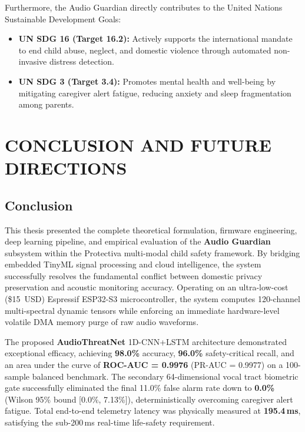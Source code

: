 \documentclass[12pt, a4paper]{report}
\begin{document}
Furthermore, the Audio Guardian directly contributes to the United Nations Sustainable Development Goals:
\begin{itemize}
    \item \textbf{UN SDG 16 (Target 16.2):} Actively supports the international mandate to end child abuse, neglect, and domestic violence through automated non-invasive distress detection.
    \item \textbf{UN SDG 3 (Target 3.4):} Promotes mental health and well-being by mitigating caregiver alert fatigue, reducing anxiety and sleep fragmentation among parents.
\end{itemize}

\chapter{CONCLUSION AND FUTURE DIRECTIONS}

\section{Conclusion}
This thesis presented the complete theoretical formulation, firmware engineering, deep learning pipeline, and empirical evaluation of the \textbf{Audio Guardian} subsystem within the Protectiva multi-modal child safety framework. By bridging embedded TinyML signal processing and cloud intelligence, the system successfully resolves the fundamental conflict between domestic privacy preservation and acoustic monitoring accuracy. Operating on an ultra-low-cost (\$15~USD) Espressif ESP32-S3 microcontroller, the system computes 120-channel multi-spectral dynamic tensors while enforcing an immediate hardware-level volatile DMA memory purge of raw audio waveforms.

The proposed \textbf{AudioThreatNet} 1D-CNN+LSTM architecture demonstrated exceptional efficacy, achieving \textbf{98.0\%} accuracy, \textbf{96.0\%} safety-critical recall, and an area under the curve of \textbf{ROC-AUC = 0.9976} (PR-AUC = 0.9977) on a 100-sample balanced benchmark. The secondary 64-dimensional vocal tract biometric gate successfully eliminated the final 11.0\% false alarm rate down to \textbf{0.0\%} (Wilson 95\% bound [0.0\%, 7.13\%]), deterministically overcoming caregiver alert fatigue. Total end-to-end telemetry latency was physically measured at \textbf{195.4\,ms}, satisfying the sub-200\,ms real-time life-safety requirement.
\end{document}
